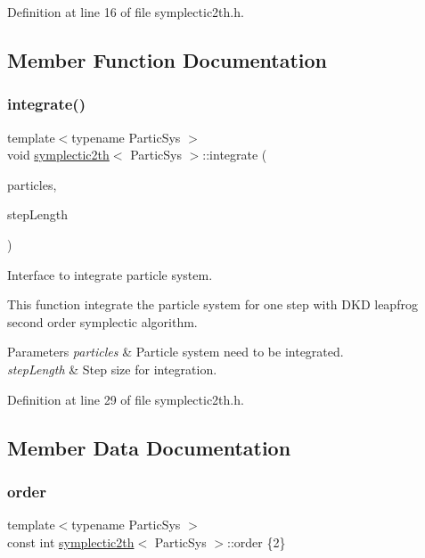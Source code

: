 Definition at line 16 of file symplectic2th.\+h.



\subsection{Member Function Documentation}
\mbox{\label{classsymplectic2th_ade78f67685ed50280a210e67397af092}} 
\subsubsection{\texorpdfstring{integrate()}{integrate()}}
{\footnotesize\ttfamily template$<$typename Partic\+Sys $>$ \\
void \mbox{\hyperlink{classsymplectic2th}{symplectic2th}}$<$ Partic\+Sys $>$\+::integrate (\begin{DoxyParamCaption}\item[{Partic\+Sys \&}]{particles,  }\item[{\mbox{\hyperlink{classsymplectic2th_a801a87947fe8e90ee68759952c937ed5}{Scalar}}}]{step\+Length }\end{DoxyParamCaption})}



Interface to integrate particle system. 

This function integrate the particle system for one step with D\+KD leapfrog second order symplectic algorithm. 
\begin{DoxyParams}{Parameters}
{\em particles} & Particle system need to be integrated. \\
\hline
{\em step\+Length} & Step size for integration. \\
\hline
\end{DoxyParams}


Definition at line 29 of file symplectic2th.\+h.



\subsection{Member Data Documentation}
\mbox{\label{classsymplectic2th_a1082d668c1081ff0116e8816f1240fcd}} 
\subsubsection{\texorpdfstring{order}{order}}
{\footnotesize\ttfamily template$<$typename Partic\+Sys $>$ \\
const int \mbox{\hyperlink{classsymplectic2th}{symplectic2th}}$<$ Partic\+Sys $>$\+::order \{2\}\hspace{0.3cm}{\ttfamily [static]}}




